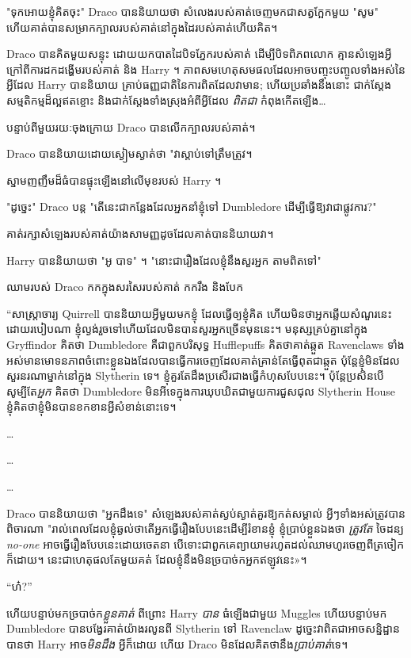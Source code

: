 {{{{{"ទុកអោយខ្ញុំគិតចុះ" Draco បាននិយាយថា សំលេងរបស់គាត់ចេញមកជាសត្វក្អែកមួយ "សូម" ហើយគាត់បានសម្រាកក្បាលរបស់គាត់នៅក្នុងដៃរបស់គាត់ហើយគិត។

\later

Draco បានគិតមួយសន្ទុះ ដោយយកបាតដៃបិទភ្នែករបស់គាត់ ដើម្បីបិទពិភពលោក គ្មានសំឡេងអ្វីក្រៅពីការដកដង្ហើមរបស់គាត់ និង Harry ។ ភាពសមហេតុសមផលដែលអាចបញ្ចុះបញ្ចូលទាំងអស់នៃអ្វីដែល Harry បាននិយាយ គ្រាប់ធញ្ញជាតិនៃការពិតដែលវាមាន; ហើយប្រឆាំងនឹងនោះ ជាក់ស្តែង សម្មតិកម្មដ៏ល្អឥតខ្ចោះ និងជាក់ស្តែងទាំងស្រុងអំពីអ្វីដែល \emph{ពិតជា} កំពុងកើតឡើង…

បន្ទាប់ពីមួយរយៈចុងក្រោយ Draco បានលើកក្បាលរបស់គាត់។

Draco បាននិយាយដោយស្ងៀមស្ងាត់ថា "វាស្តាប់ទៅត្រឹមត្រូវ។

ស្នាមញញឹមដ៏ធំបានផ្ទុះឡើងនៅលើមុខរបស់ Harry ។

"ដូច្នេះ" Draco បន្ត "តើនេះជាកន្លែងដែលអ្នកនាំខ្ញុំទៅ Dumbledore ដើម្បីធ្វើឱ្យវាជាផ្លូវការ?"

គាត់​រក្សា​សំឡេង​របស់​គាត់​យ៉ាង​សាមញ្ញ​ដូច​ដែល​គាត់​បាន​និយាយ​វា​។

Harry បាននិយាយថា "អូ បាទ" ។ "នោះជារឿងដែលខ្ញុំនឹងសួរអ្នក តាមពិតទៅ"

ឈាមរបស់ Draco កកក្នុងសរសៃរបស់គាត់ កករឹង និងបែក

“សាស្រ្តាចារ្យ Quirrell បាននិយាយអ្វីមួយមកខ្ញុំ ដែលធ្វើឲ្យខ្ញុំគិត ហើយមិនថាអ្នកឆ្លើយសំណួរនេះដោយរបៀបណា ខ្ញុំល្ងង់រួចទៅហើយដែលមិនបានសួរអ្នកច្រើនមុននេះ។ មនុស្សគ្រប់គ្នានៅក្នុង Gryffindor គិតថា Dumbledore គឺជាពួកបរិសុទ្ធ Hufflepuffs គិតថាគាត់ឆ្កួត Ravenclaws ទាំងអស់មានមោទនភាពចំពោះខ្លួនឯងដែលបានធ្វើការចេញដែលគាត់គ្រាន់តែធ្វើពុតជាឆ្កួត ប៉ុន្តែខ្ញុំមិនដែលសួរនរណាម្នាក់នៅក្នុង Slytherin ទេ។ ខ្ញុំគួរតែដឹងប្រសើរជាងធ្វើកំហុសបែបនេះ។ ប៉ុន្តែប្រសិនបើសូម្បីតែ\emph{អ្នក} គិតថា Dumbledore មិនអីទេក្នុងការឃុបឃិតជាមួយការជួសជុល Slytherin House ខ្ញុំគិតថាខ្ញុំមិនបានខកខានអ្វីសំខាន់នោះទេ។

…

…

…

Draco បាននិយាយថា "អ្នកដឹងទេ" សំឡេងរបស់គាត់ស្ងប់ស្ងាត់គួរឱ្យកត់សម្គាល់ អ្វីៗទាំងអស់ត្រូវបានពិចារណា "រាល់ពេលដែលខ្ញុំឆ្ងល់ថាតើអ្នកធ្វើរឿងបែបនេះដើម្បីរំខានខ្ញុំ ខ្ញុំប្រាប់ខ្លួនឯងថា \emph{ត្រូវតែ} ចៃដន្យ \emph{no-one} អាច​ធ្វើ​រឿង​បែប​នេះ​ដោយ​ចេតនា បើ​ទោះ​ជា​ពួក​គេ​ព្យាយាម​រហូត​ដល់​ឈាម​ហូរ​ចេញ​ពី​ត្រចៀក​ក៏​ដោយ។ នេះ​ជា​ហេតុផល​តែ​មួយ​គត់ ដែល​ខ្ញុំ​នឹង​មិន​ច្របាច់ក​អ្នក​ឥឡូវ​នេះ»។

“ហ៎?”

ហើយបន្ទាប់មកច្របាច់ក\emph{ខ្លួនគាត់} ពីព្រោះ Harry \emph{បាន} ធំឡើងជាមួយ Muggles ហើយបន្ទាប់មក Dumbledore បានបង្វែរគាត់យ៉ាងរលូនពី Slytherin ទៅ Ravenclaw ដូច្នេះវាពិតជាអាចសន្និដ្ឋានបានថា Harry អាច\emph{មិនដឹង} អ្វីក៏ដោយ ហើយ Draco មិនដែលគិតថានឹង\emph{ប្រាប់គាត់}ទេ។

}}}}}
